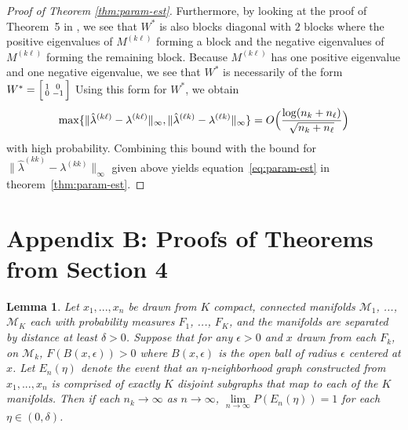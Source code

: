 \documentclass[
  12pt,
]{article}
\newtheorem{lemma}{Lemma}[section]
\theoremstyle{definition}
\theoremstyle{definition}
\theoremstyle{definition}
\theoremstyle{definition}
\theoremstyle{remark}
\begin{document}
\begin{proof}[Proof of Theorem \ref{thm:param-est}]
Furthermore, by looking at the proof of Theorem~5 in
\citep{rubindelanchy2017statistical}, we see that $W^{*}$ is also
blocks diagonal with $2$ blocks where the positive eigenvalues of $M^{(k \ell)}$
forming a block and the negative eigenvalues of $M^{(k \ell)}$ forming
the remaining block. 
Because $M^{(k \ell)}$ has one positive eigenvalue and one negative
eigenvalue, we see that $W^{*}$ is necessarily of the form $W^{*}
= \Bigl[\begin{smallmatrix} 1 & 0 \\ 0 & - 1\end{smallmatrix}\Bigr]$
Using this form for $W^{*}$, we obtain
$$\max\{\|\hat{\lambda}^{(k \ell)} - \lambda^{(k \ell)}\|_{\infty},
\|\hat{\lambda}^{(\ell k)} - \lambda^{(\ell k)}\|_{\infty}\}  =
O\Bigl(\frac{\log(n_k + n_{\ell})}{\sqrt{n_k + n_{\ell}}}\Bigr)$$
with high probability. Combining this bound with the bound for
$\|\hat{\lambda}^{(kk)} - \lambda^{(kk)}\|_{\infty}$ given above
yields equation~\eqref{eq:param-est} in theorem~\ref{thm:param-est}. 
\end{proof}

\section*{Appendix B: Proofs of Theorems from Section 4}

\begin{lemma}
\label{lemma:no-noise}
Let $x_1, ..., x_n$ be drawn from $K$ compact, connected manifolds $\mathcal{M}_1$, ..., $\mathcal{M}_K$ each with probability measures $F_1$, ..., $F_K$, and the manifolds are separated by distance at least $\delta > 0$. 
Suppose that for any $\epsilon > 0$ and $x$ drawn from each $F_k$, on $\mathcal{M}_k$, $F(B(x, \epsilon)) > 0$ where $B(x, \epsilon)$ is the open ball of radius $\epsilon$ centered at $x$. 
Let $E_n(\eta)$ denote the event that an $\eta$-neighborhood graph constructed from $x_1, ..., x_n$ is comprised of exactly $K$ disjoint subgraphs that map to each of the $K$ manifolds. 
Then if each $n_k \to \infty$ as $n \to \infty$, $\lim\limits_{n \to \infty} P(E_n(\eta)) = 1$ for each $\eta \in (0, \delta)$. 
\end{lemma}
\end{document}
